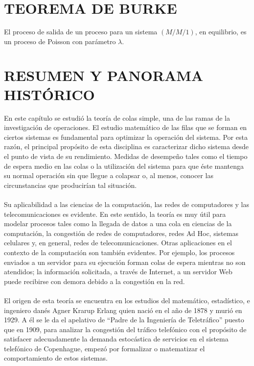 \section{TEOREMA DE BURKE}
\begin{theorem}\label{1th:Z_m}
El proceso de salida de un proceso para un sistema $ \left( M/M/1 \right) $, en equilibrio, es un proceso de Poisson con parámetro $ \lambda $.
\end{theorem}

\section{RESUMEN Y PANORAMA HISTÓRICO}
En este capítulo se estudió la teoría de colas simple, una de las ramas de la investigación de operaciones. El estudio matemático de las filas que se forman en ciertos sistemas es fundamental para optimizar la operación del sistema. Por esta razón, el principal propósito de esta disciplina es caracterizar dicho sistema desde el punto de vista de su rendimiento. Medidas de desempeño tales
como el tiempo de espera medio en las colas o la utilización del sistema para que éste mantenga su normal operación sin que llegue a colapsar o, al menos, conocer las circunstancias que producirían tal situación.
\\
\\
Su aplicabilidad a las ciencias de la computación, las redes de computadores y las telecomunicaciones es evidente. En este sentido, la teoría es muy útil para modelar procesos tales como la llegada de datos a una cola en ciencias de la computación, la congestión de redes de computadores, redes Ad Hoc, sistemas celulares y, en general, redes de telecomunicaciones. Otras aplicaciones en el contexto de la computación son también evidentes. Por ejemplo, los procesos enviados a un servidor para su ejecución forman colas de espera mientras no son atendidos; la información solicitada, a través de Internet, a un servidor Web puede recibirse con demora debido a la congestión en la red. 
\\
\\
El origen de esta teoría se encuentra en los estudios del matemático, estadístico, e ingeniero danés Agner Krarup Erlang quien nació en el año de 1878 y murió en 1929. A él se le da el apelativo de “Padre de la Ingeniería de Teletráfico” puesto que en 1909, para analizar la congestión del tráfico telefónico con el propósito de satisfacer adecuadamente la demanda estocástica de servicios en el sistema telefónico de Copenhague, empezó por formalizar o matematizar el comportamiento de estos sistemas.


